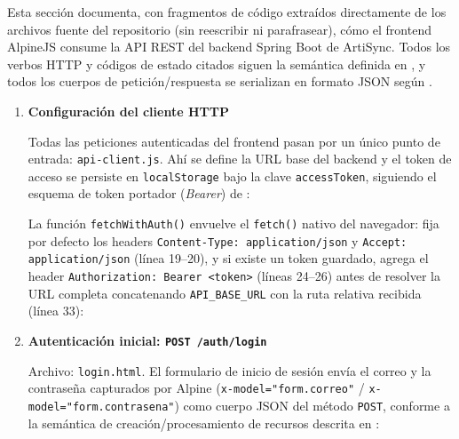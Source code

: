 \documentclass[12pt,a4paper]{article}
\begin{document}
Esta sección documenta, con fragmentos de código extraídos directamente de los archivos fuente del repositorio (sin reescribir ni parafrasear), cómo el frontend AlpineJS consume la API REST del backend Spring Boot de ArtiSync. Todos los verbos HTTP y códigos de estado citados siguen la semántica definida en \cite{rfc9110}, y todos los cuerpos de petición/respuesta se serializan en formato JSON según \cite{rfc8259}.

\begin{enumerate}

    \item \textbf{Configuración del cliente HTTP}\label{step:cliente-http}

    Todas las peticiones autenticadas del frontend pasan por un único punto de entrada: \texttt{api-client.js}. Ahí se define la URL base del backend y el token de acceso se persiste en \texttt{localStorage} bajo la clave \texttt{accessToken}, siguiendo el esquema de token portador (\emph{Bearer}) de \cite{rfc7519}:

    

    

    La función \texttt{fetchWithAuth()} envuelve el \texttt{fetch()} nativo del navegador: fija por defecto los headers \texttt{Content-Type: application/json} y \texttt{Accept: application/json} (línea 19--20), y si existe un token guardado, agrega el header \texttt{Authorization: Bearer \textless token\textgreater} (líneas 24--26) antes de resolver la URL completa concatenando \texttt{API\_BASE\_URL} con la ruta relativa recibida (línea 33):

    

    \item \textbf{Autenticación inicial: \texttt{POST /auth/login}}\label{step:login}

    Archivo: \texttt{login.html}. El formulario de inicio de sesión envía el correo y la contraseña capturados por Alpine (\texttt{x-model="form.correo"} / \texttt{x-model="form.contrasena"}) como cuerpo JSON del método \texttt{POST}, conforme a la semántica de creación/procesamiento de recursos descrita en \cite{rfc9110}:


\end{enumerate}
\end{document}
